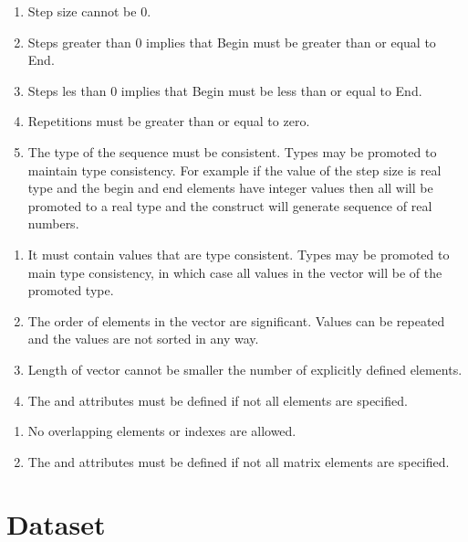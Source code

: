 \begin{valrules}

\begin{enumerate}
\item Step size cannot be 0.
\item Steps greater than 0 implies that Begin must be greater than or equal to End.
\item Steps les than 0 implies that Begin must be less than or equal
  to End.
\item Repetitions must be greater than or equal to zero.
\item The type of the sequence must be consistent. Types may be
  promoted to maintain type consistency. For example if the value of
  the step size is real type and the begin and end elements have
  integer values then all will be promoted to a real type and the
  construct will generate sequence of real numbers.
\end{enumerate}


\begin{enumerate}
\item It must contain values that are type
consistent. Types may be promoted to main type consistency, in which
case all values in the vector will be of the promoted type.
\item The order of elements in the vector are significant. Values can
  be repeated and the values are not sorted in any way.
\item Length of vector cannot be smaller the number of explicitly  defined elements.
\item The  and  attributes must be defined if not all elements are specified.
\end{enumerate}

\begin{enumerate}
\item No overlapping elements or indexes are allowed.
\item The  and  attributes must be defined if not all matrix elements are specified.
\end{enumerate}

\end{valrules}

\section{Dataset}

